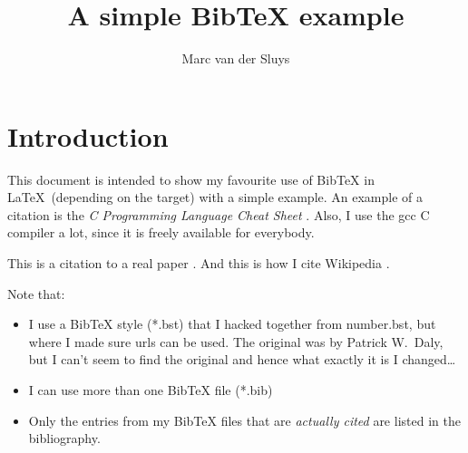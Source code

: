 \documentclass[11pt]{article}  %
\title{A simple BibTeX example}
\author{Marc van der Sluys}
\begin{document}
\maketitle

\tableofcontents


\section{Introduction}

This document is intended to show my favourite use of BibTeX in \LaTeX\ (depending on the target) with a simple example.
An example of a citation is the \emph{C Programming Language Cheat Sheet} \cite{Choudhary}.  Also, I use the gcc
C compiler \cite{gcc} a lot, since it is freely available for everybody.

This is a citation to a real paper \cite{leung1980scheduling}.  And this is how I cite Wikipedia \cite{wiki:Cron}.

Note that:
\begin{itemize}
\item I use a BibTeX style (*.bst) that I hacked together from number.bst, but where I made sure urls can be
  used.  The original was by Patrick W.\ Daly, but I can't seem to find the original and hence what exactly it
  is I changed\ldots
\item I can use more than one BibTeX file (*.bib)
\item Only the entries from my BibTeX files that are \emph{actually cited} are listed in the bibliography.
\end{itemize}



\end{document}
